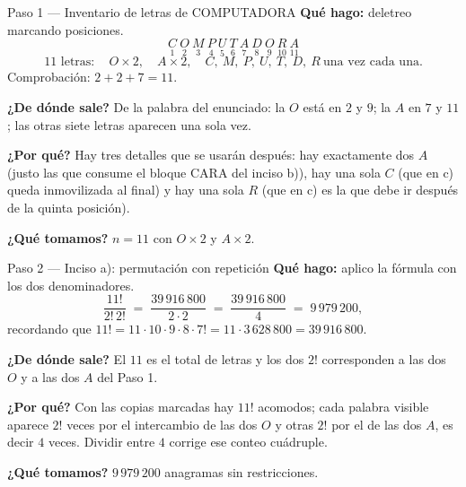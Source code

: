\documentclass[11pt]{article}
\begin{document}
\begin{paso}{Paso 1 --- Inventario de letras de COMPUTADORA}
\textbf{Qué hago:} deletreo marcando posiciones.
\[
\underset{1}{C}\ \underset{2}{O}\ \underset{3}{M}\ \underset{4}{P}\ \underset{5}{U}\ \underset{6}{T}\
\underset{7}{A}\ \underset{8}{D}\ \underset{9}{O}\ \underset{10}{R}\ \underset{11}{A}
\]
\[
11 \text{ letras}:\quad O\times 2,\quad A\times 2,\quad
C,\ M,\ P,\ U,\ T,\ D,\ R \ \text{una vez cada una}.
\]
Comprobación: $2+2+7=11$. \checkmark

\textbf{¿De dónde sale?} De la palabra del enunciado: la $O$ está en $2$ y $9$; la $A$ en $7$ y $11$; las
otras siete letras aparecen una sola vez.

\textbf{¿Por qué?} Hay tres detalles que se usarán después: hay exactamente dos $A$ (justo las que consume el
bloque CARA del inciso b)), hay una sola $C$ (que en c) queda inmovilizada al final) y hay una sola $R$ (que
en c) es la que debe ir después de la quinta posición).

\textbf{¿Qué tomamos?} $n=11$ con $O\times2$ y $A\times2$.
\end{paso}

\begin{paso}{Paso 2 --- Inciso a): permutación con repetición}
\textbf{Qué hago:} aplico la fórmula con los dos denominadores.
\[
\frac{11!}{2!\,2!} \;=\; \frac{39\,916\,800}{2\cdot 2} \;=\; \frac{39\,916\,800}{4} \;=\; 9\,979\,200 ,
\]
recordando que $11!=11\cdot 10\cdot 9\cdot 8\cdot 7! = 11\cdot 3\,628\,800 = 39\,916\,800$.

\textbf{¿De dónde sale?} El $11$ es el total de letras y los dos $2!$ corresponden a las dos $O$ y a las dos
$A$ del Paso 1.

\textbf{¿Por qué?} Con las copias marcadas hay $11!$ acomodos; cada palabra visible aparece $2!$ veces por el
intercambio de las dos $O$ y otras $2!$ por el de las dos $A$, es decir $4$ veces. Dividir entre $4$ corrige
ese conteo cuádruple.

\textbf{¿Qué tomamos?} $9\,979\,200$ anagramas sin restricciones.
\end{paso}
\end{document}
